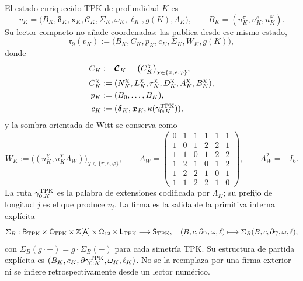 \begin{definition}
\label{def:continuo-comun-lector-compacto-nonadico}
El estado enriquecido TPK de profundidad \(K\) es
\begin{equation}
\label{eq:continuo-comun-estado-tpk-completo}
 v_K=
 \bigl(
 B_K,\boldsymbol\delta_K,\boldsymbol x_K,
 \boldsymbol{\mathcal C}_K,\Sigma_K,
 \omega_K,\ell_K,g(K),\Lambda_K
 \bigr),
 \qquad
 B_K=(u_K^\pi,u_K^e,u_K^\varphi).
\end{equation}
Su lector compacto no añade coordenadas: las publica desde ese mismo estado,
\begin{equation}
\label{eq:continuo-comun-lector-compacto-nonadico}
 \mathfrak r_9(v_K)
 :=\bigl(B_K,C_K,p_K,c_K,\Sigma_K,W_K,g(K)\bigr),
\end{equation}
donde
\begin{equation}
\label{eq:continuo-comun-lector-compacto-componentes}
\begin{aligned}
 C_K&:=\boldsymbol{\mathcal C}_K
      =\bigl(C_K^\chi\bigr)_{\chi\in\{\pi,e,\varphi\}},\\
 C_K^\chi&:=(N_K^\chi,L_K^\chi,r_K^\chi,
             D_K^\chi,A_K^\chi,B_K^\chi),\\
 p_K&:=(B_0,\ldots,B_K),\\
 c_K&:=(\boldsymbol\delta_K,\boldsymbol x_K,
       \kappa(\gamma^{\rm TPK}_{0:K})),
\end{aligned}
\end{equation}
y la sombra orientada de Witt se conserva como
\begin{equation}
\label{eq:continuo-comun-sombra-witt}
 W_K:=
 \bigl((u_K^\chi,u_K^\chi A_W)\bigr)_
       {\chi\in\{\pi,e,\varphi\}},
 \qquad
 A_W=
 \begin{pmatrix}
 0&1&1&1&1&1\\
 1&0&1&2&2&1\\
 1&1&0&1&2&2\\
 1&2&1&0&1&2\\
 1&2&2&1&0&1\\
 1&1&2&2&1&0
 \end{pmatrix},
 \qquad A_W^2=-I_6.
\end{equation}
La ruta \(\gamma^{\rm TPK}_{0:K}\) es la palabra de extensiones codificada
por \(\Lambda_K\); su prefijo de longitud \(j\) es el que produce
\(v_j\). La firma es la salida de la primitiva interna explícita
\begin{equation}
\label{eq:continuo-comun-primitiva-firma-tpk}
 \Sigma_B:
 \mathsf B_{\rm TPK}\times\mathsf C_{\rm TPK}
 \times\mathbb Z[\mathsf A]\times\Omega_{12}\times\mathsf L_{\rm TPK}
 \longrightarrow\mathsf S_{\rm TPK},
 \quad
 (B,c,\partial\gamma,\omega,\ell)\longmapsto
 \Sigma_B(B,c,\partial\gamma,\omega,\ell),
\end{equation}
con \(\Sigma_B(g\cdot-)=g\cdot\Sigma_B(-)\) para cada simetría TPK. Su
estructura de partida explícita es
\((B_K,c_K,\partial\gamma^{\rm TPK}_{0:K},\omega_K,\ell_K)\). No se la reemplaza por una
firma exterior ni se infiere retrospectivamente desde un lector numérico.
\end{definition}

